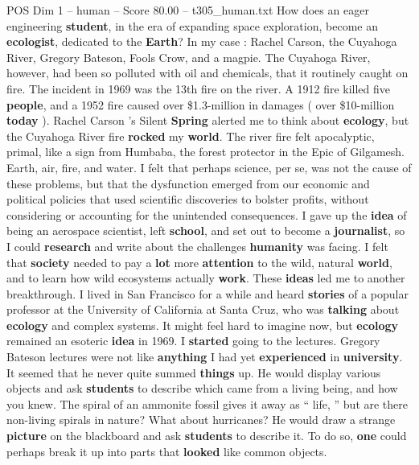 \begin{textsample}{POS Dim 1 – human – Score 80.00 – t305\_human.txt}  \label{ex:f1_pos_016}
How does an eager engineering \textbf{student}, in the era of expanding space exploration, become an \textbf{ecologist}, dedicated to the \textbf{Earth}?
In my case : Rachel Carson, the Cuyahoga River, Gregory Bateson, Fools Crow, and a magpie.
The Cuyahoga River, however, had been so polluted with oil and chemicals, that it routinely caught on fire.
The incident in 1969 was the 13th fire on the river.
A 1912 fire killed five \textbf{people}, and a 1952 fire caused over \$1.3-million in damages ( over \$10-million \textbf{today} ).
Rachel Carson ’s Silent \textbf{Spring} alerted me to think about \textbf{ecology}, but the Cuyahoga River fire \textbf{rocked} my \textbf{world}.
The river fire felt apocalyptic, primal, like a sign from Humbaba, the forest protector in the Epic of Gilgamesh.
Earth, air, fire, and water.
I felt that perhaps science, per se, was not the cause of these problems, but that the dysfunction emerged from our economic and political policies that used scientific discoveries to bolster profits, without considering or accounting for the unintended consequences.
I gave up the \textbf{idea} of being an aerospace scientist, left \textbf{school}, and set out to become a \textbf{journalist}, so I could \textbf{research} and write about the challenges \textbf{humanity} was facing.
I felt that \textbf{society} needed to pay a \textbf{lot} more \textbf{attention} to the wild, natural \textbf{world}, and to learn how wild ecosystems actually \textbf{work}.
These \textbf{ideas} led me to another breakthrough.
I lived in San Francisco for a while and heard \textbf{stories} of a popular professor at the University of California at Santa Cruz, who was \textbf{talking} about \textbf{ecology} and complex systems.
It might feel hard to imagine now, but \textbf{ecology} remained an esoteric \textbf{idea} in 1969.
I \textbf{started} going to the lectures.
Gregory Bateson lectures were not like \textbf{anything} I had yet \textbf{experienced} in \textbf{university}.
It seemed that he never quite summed \textbf{things} up.
He would display various objects and ask \textbf{students} to describe which came from a living being, and how you knew.
The spiral of an ammonite fossil gives it away as “ life, ” but are there non-living spirals in nature?
What about hurricanes?
He would draw a strange \textbf{picture} on the blackboard and ask \textbf{students} to describe it.
To do so, \textbf{one} could perhaps break it up into parts that \textbf{looked} like common objects.

\end{textsample}
